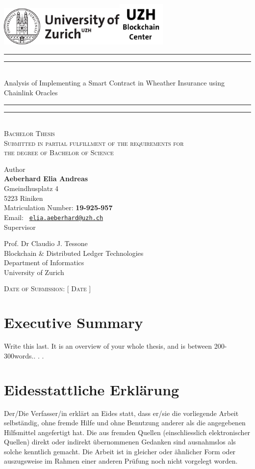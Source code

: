 \documentclass[11pt,a4paper,english,oneside]{book}
\makeatletter
\newcommand*{\uzhlogo}{\includegraphics[height=2cm]{Logo-UZH-black}}
\newcommand*{\bcclogo}{\includegraphics[height=2.2cm]{Logo-BCC-black}}
\newcommand*{\titleGP}{\begingroup %
\centering %
\vspace*{\baselineskip} %
\uzhlogo\hspace{8cm}\bcclogo\\[2\baselineskip] %

\rule{\textwidth}{1.6pt}\vspace*{-\baselineskip}\vspace*{2pt} %
\rule{\textwidth}{0.4pt}\\[\baselineskip] %
{\LARGE \sc Analysis of Implementing a Smart Contract in Wheather Insurance using Chainlink Oracles}\\[0.2\baselineskip] %
\rule{\textwidth}{0.4pt}\vspace*{-\baselineskip}\vspace{3.2pt} %
\rule{\textwidth}{1.6pt}\\[2\baselineskip] %
\scshape %
Bachelor Thesis\\[2\baselineskip]
Submitted in partial fulfillment of the requirements for \\ the degree of Bachelor of Science \par
\vspace*{2\baselineskip}
Author\\
{\Large \textbf{Aeberhard Elia Andreas} \\ [8pt]
 }
Gmeindhusplatz 4 \\ 5223 Riniken \\[5pt]
Matriculation Number: \textbf{19-925-957}\\[8pt]
 Email: \texttt{ \href{mailto:elia.aeberhard@uzh.ch} {elia.aeberhard@uzh.ch} }  \\


\vspace*{2\baselineskip}
Supervisor\\
{\Large Prof. Dr Claudio J. Tessone\\[8pt]
\small Blockchain \& Distributed Ledger Technologies\\[5pt]Department of Informatics \\[8pt]University of Zurich\par}
\vspace*{2\baselineskip}

\vfill
{\scshape Date of Submission: [ Date ]} \\[0.3\baselineskip]
\endgroup}
\makeatother
\begin{document}
\thispagestyle{empty}
\titleGP
\newpage
\onehalfspacing
\setcounter{page}{1}

\section*{Executive Summary}
\thispagestyle{firststyle}
Write  this  last.   It  is  an  overview  of  your  whole  thesis,  and  is  between  200-300words.. . .


\tableofcontents
\newpage
{}








\newpage

\appendix
\noappendicestocpagenum
\addappheadtotoc
\appendixpage

\renewcommand{\theequation}{A.\arabic{equation}}


%

\printbibliography

\newpage
\thispagestyle{firststyle}
\section*{Eidesstattliche Erklärung}
Der/Die Verfasser/in erklärt an Eides statt, dass er/sie die vorliegende Arbeit selbständig, ohne fremde Hilfe und ohne Benutzung anderer als die angegebenen Hilfsmittel angefertigt hat. Die aus fremden Quellen (einschliesslich elektronischer Quellen) direkt oder indirekt übernommenen Gedanken sind ausnahmslos als solche kenntlich gemacht. Die Arbeit ist in gleicher oder ähnlicher Form oder auszugsweise im Rahmen einer anderen Prüfung noch nicht vorgelegt worden.\\[2cm]
 \hfill {}
\end{document}
